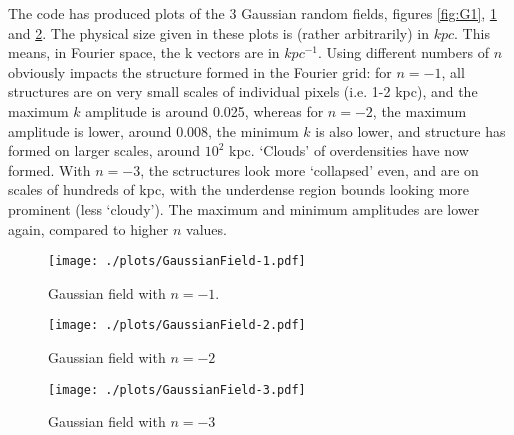 \documentclass{article}
\begin{document}
The code has produced plots of the 3 Gaussian random fields, figures \ref{fig:G1}, \ref{fig:G2} and \ref{fig:G3}. The physical size given in these plots is (rather arbitrarily) in $kpc$. This means, in Fourier space, the k vectors are in $kpc^{-1}$. Using different numbers of $n$ obviously impacts the structure formed in the Fourier grid: for $n=-1$, all structures are on very small scales of individual pixels (i.e. 1-2 kpc), and the maximum $k$ amplitude is around 0.025, whereas for $n=-2$, the maximum amplitude is lower, around 0.008, the minimum $k$ is also lower, and structure has formed on larger scales, around $10^2$ kpc. `Clouds' of overdensities have now formed. With $n=-3$, the sctructures look more `collapsed' even, and are on scales of hundreds of kpc, with the underdense region bounds looking more prominent (less `cloudy'). The maximum and minimum amplitudes are lower again, compared to higher $n$ values.

\begin{figure}[!h]
\centering
\begin{minipage}[t]{7.8cm}
    \centering
    \texttt{[image: ./plots/GaussianField-1.pdf]}
    \caption{Gaussian field with $n = -1$.}
    \label{fig:G1}
\end{minipage}
\qquad
\begin{minipage}[t]{7.8cm}
    \centering
    \texttt{[image: ./plots/GaussianField-2.pdf]}
    \caption{Gaussian field with $n = -2$}
    \label{fig:G2}
\end{minipage}
\end{figure}

\begin{figure}
    \centering
    \texttt{[image: ./plots/GaussianField-3.pdf]}
    \caption{Gaussian field with $n = -3$}
    \label{fig:G3}
\end{figure}
\end{document}
